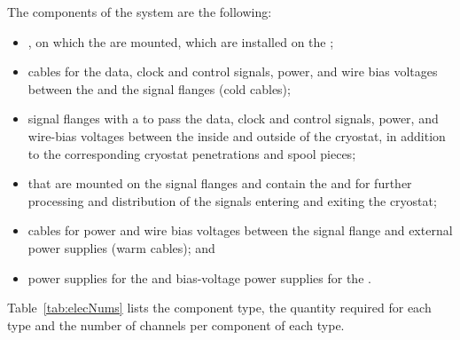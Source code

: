The components of the  system are the following:
\begin{itemize}
\item{, on which the  are mounted, which are installed on the ;}
\item{cables for the data, clock and control signals,  power, and wire bias voltages between the  and the signal flanges (cold cables);}
\item{signal flanges with a  \fdth to pass the data, clock and control signals,  power, and  wire-bias voltages between the inside and outside of the cryostat, in addition to the corresponding cryostat penetrations and spool pieces;}
\item{%
 that are mounted on the signal flanges and contain
the %
 and %
 for further processing
and distribution of the signals entering and exiting the cryostat;}
\item{cables for  power and wire bias voltages between the signal flange and external power
supplies (warm cables); and}
\item{ power supplies for the  and bias-voltage power supplies for the .}
\end{itemize}

Table~\ref{tab:elecNums} lists the component type, the quantity required for each type  and the number of channels per component of each type.

